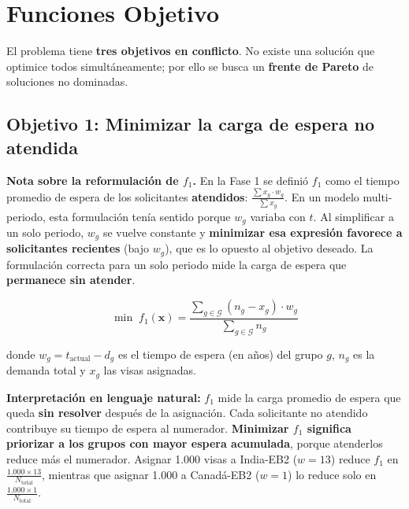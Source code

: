 \documentclass[12pt,letterpaper]{article}
\begin{document}
\section{Funciones Objetivo}
\label{sec:objetivos}

El problema tiene \textbf{tres objetivos en conflicto}. No existe una solución que optimice todos simultáneamente; por ello se busca un \textbf{frente de Pareto} de soluciones no dominadas.

\subsection{Objetivo 1: Minimizar la carga de espera no atendida}

\begin{restrictionbox}
\textbf{Nota sobre la reformulación de $f_1$.} En la Fase 1 se definió $f_1$ como el tiempo promedio de espera de los solicitantes \textbf{atendidos}: $\frac{\sum x_g \cdot w_g}{\sum x_g}$. En un modelo multi-periodo, esta formulación tenía sentido porque $w_g$ variaba con $t$. Al simplificar a un solo periodo, $w_g$ se vuelve constante y \textbf{minimizar esa expresión favorece a solicitantes recientes} (bajo $w_g$), que es lo opuesto al objetivo deseado. La formulación correcta para un solo periodo mide la carga de espera que \textbf{permanece sin atender}.
\end{restrictionbox}

\begin{formulabox}
\begin{equation}
\min \; f_1(\mathbf{x}) = \frac{\displaystyle\sum_{g \in \mathcal{G}} (n_g - x_g) \cdot w_g}{\displaystyle\sum_{g \in \mathcal{G}} n_g}
\label{eq:obj1_fase2}
\end{equation}

donde $w_g = t_{\text{actual}} - d_g$ es el tiempo de espera (en años) del grupo $g$, $n_g$ es la demanda total y $x_g$ las visas asignadas.
\end{formulabox}

\textbf{Interpretación en lenguaje natural:} $f_1$ mide la carga promedio de espera que queda \textbf{sin resolver} después de la asignación. Cada solicitante no atendido contribuye su tiempo de espera al numerador. \textbf{Minimizar $f_1$ significa priorizar a los grupos con mayor espera acumulada}, porque atenderlos reduce más el numerador. Asignar 1.000 visas a India-EB2 ($w = 13$) reduce $f_1$ en $\frac{1.000 \times 13}{N_{\text{total}}}$, mientras que asignar 1.000 a Canadá-EB2 ($w = 1$) lo reduce solo en $\frac{1.000 \times 1}{N_{\text{total}}}$.
\end{document}
